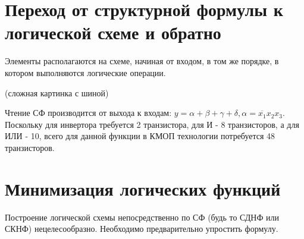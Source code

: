 \documentclass[a4paper,12pt]{report}
\begin{document}
\section{Переход от структурной формулы к логической схеме и обратно}
Элементы располагаются на схеме, начиная от входом, в том же порядке, в котором выполняются логические операции.

(сложная картинка с шиной)

Чтение СФ производится от выхода к входам: $y=\alpha+\beta+\gamma+\delta, \alpha=\overline{x_1}x_2x_3$. Поскольку для инвертора требуется 2 транзистора, для И - 8 транзисторов, а для ИЛИ - 10, всего для данной функции в КМОП технологии потребуется 48 транзисторов.

\section{Минимизация логических функций}
Построение логической схемы непосредственно по СФ (будь то СДНФ или СКНФ) нецелесообразно. Необходимо предварительно упростить формулу.
\end{document}
